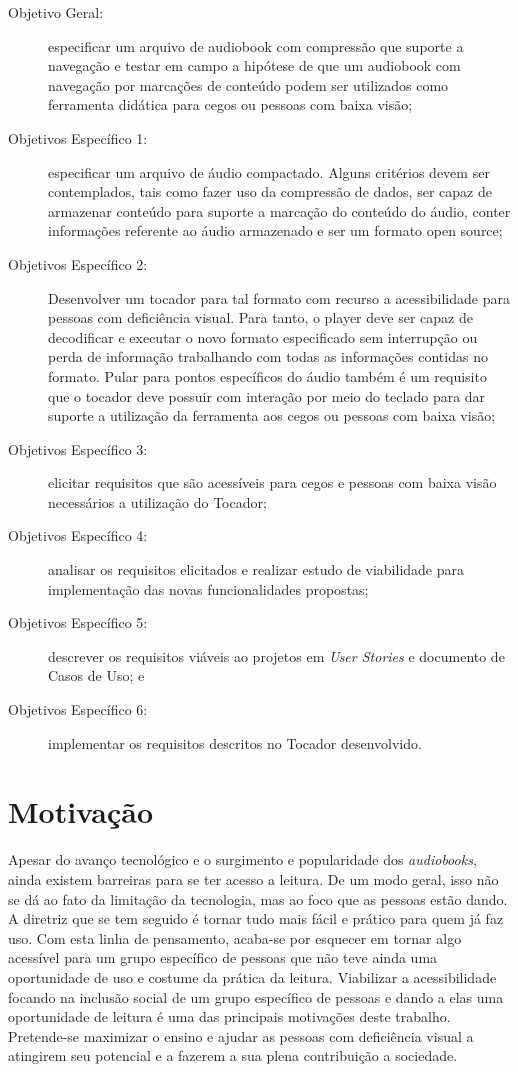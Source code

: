 \begin{description}
	\item [Objetivo Geral:] especificar um arquivo de audiobook com compressão que suporte a navegação e testar em campo a hipótese de que um audiobook com navegação por marcações de conteúdo podem ser utilizados como ferramenta didática para cegos ou pessoas com baixa visão;
	\item [Objetivos Específico 1:] especificar um arquivo de áudio compactado. Alguns critérios devem ser contemplados, tais como fazer uso da compressão de dados, ser capaz de armazenar conteúdo para suporte a marcação do conteúdo do áudio, conter informações referente ao áudio armazenado e ser um formato open source;
	\item [Objetivos Específico 2:] Desenvolver um tocador para tal formato com recurso a acessibilidade para pessoas com deficiência visual. Para tanto, o player deve ser capaz de decodificar e executar o novo formato especificado sem interrupção ou perda de informação trabalhando com todas as informações contidas no formato. Pular para pontos específicos do áudio também é um requisito que o tocador deve possuir  com interação por meio do teclado para dar suporte a utilização da ferramenta aos cegos ou pessoas com baixa visão;
	\item [Objetivos Específico 3:] elicitar requisitos que são acessíveis para cegos e pessoas com baixa visão necessários a utilização do Tocador;
	\item [Objetivos Específico 4:] analisar os requisitos elicitados e realizar estudo de viabilidade para implementação das novas funcionalidades propostas;
	\item [Objetivos Específico 5:] descrever os requisitos viáveis ao projetos em \textit{User Stories} e documento de Casos de Uso; e
	\item [Objetivos Específico 6:] implementar os requisitos descritos no Tocador desenvolvido.
\end{description}

\section{Motivação}

Apesar do avanço tecnológico e o surgimento e popularidade dos \textit{audiobooks}, ainda existem barreiras para se ter acesso a leitura. De um modo geral, isso não se dá ao fato da limitação da tecnologia, mas ao foco que as pessoas estão dando. A diretriz que se tem seguido é tornar tudo mais fácil e prático para quem já faz uso. Com esta linha de pensamento, acaba-se por esquecer em tornar algo acessível para um grupo específico de pessoas que não teve ainda uma oportunidade de uso e costume da prática da leitura. Viabilizar a acessibilidade focando na inclusão social de um grupo específico de pessoas e dando a elas uma oportunidade de leitura é uma das principais motivações deste trabalho. Pretende-se maximizar o ensino e ajudar as pessoas com deficiência visual a atingirem seu potencial e a fazerem a sua plena contribuição a sociedade.


